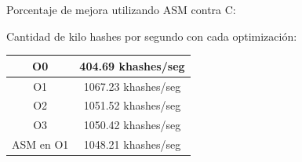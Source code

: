 \documentclass[a4paper, 10pt, twoside]{article}
\begin{document}





Porcentaje de mejora utilizando ASM contra C:

\begin{center}
\end{center}

Cantidad de kilo hashes por segundo con cada optimización:

\begin{center}
  \begin{tabular}{ | c | c | }
    \hline
   O0 & 404.69 khashes/seg \\ \hline
   O1 & 1067.23 khashes/seg \\ \hline
   O2 & 1051.52 khashes/seg \\ \hline
   O3 & 1050.42 khashes/seg \\ \hline
   ASM en O1 & 1048.21 khashes/seg \\ \hline
  \end{tabular}
\end{center}



\end{document}
